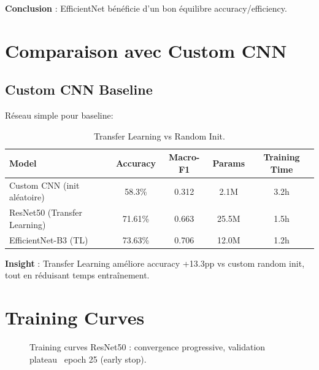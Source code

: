 \documentclass[12pt,a4paper,oneside]{report}
\begin{document}
\textbf{Conclusion} : EfficientNet bénéficie d'un bon équilibre 
accuracy/efficiency.

\section{Comparaison avec Custom CNN}

\subsection{Custom CNN Baseline}

Réseau simple pour baseline:

\begin{table}[H]
\centering
\begin{tabular}{|l|c|c|c|c|}
\hline
\textbf{Model} & \textbf{Accuracy} & \textbf{Macro-F1} & 
\textbf{Params} & \textbf{Training Time} \\
\hline
Custom CNN (init aléatoire) & 58.3\% & 0.312 & 2.1M & 3.2h \\
ResNet50 (Transfer Learning) & 71.61\% & 0.663 & 25.5M & 1.5h \\
EfficientNet-B3 (TL) & 73.63\% & 0.706 & 12.0M & 1.2h \\
\hline
\end{tabular}
\caption{Transfer Learning vs Random Init.}
\label{tab:tl_impact}
\end{table}

\textbf{Insight} : Transfer Learning améliore accuracy +13.3pp vs 
custom random init, tout en réduisant temps entraînement.

\section{Training Curves}

\begin{figure}[H]
\centering
{}
\caption{Training curves ResNet50 : convergence progressive, 
validation plateau ~epoch 25 (early stop).}
\label{fig:training_curves}
\end{figure}
\end{document}
